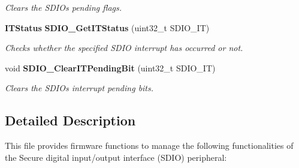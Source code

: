 \begin{DoxyCompactItemize}
\begin{DoxyCompactList}\small\item\em Clears the S\+D\+IO\textquotesingle{}s pending flags. \end{DoxyCompactList}\item 
\textbf{ I\+T\+Status} \textbf{ S\+D\+I\+O\+\_\+\+Get\+I\+T\+Status} (uint32\+\_\+t S\+D\+I\+O\+\_\+\+IT)
\begin{DoxyCompactList}\small\item\em Checks whether the specified S\+D\+IO interrupt has occurred or not. \end{DoxyCompactList}\item 
void \textbf{ S\+D\+I\+O\+\_\+\+Clear\+I\+T\+Pending\+Bit} (uint32\+\_\+t S\+D\+I\+O\+\_\+\+IT)
\begin{DoxyCompactList}\small\item\em Clears the S\+D\+IO\textquotesingle{}s interrupt pending bits. \end{DoxyCompactList}\end{DoxyCompactItemize}


\subsection{Detailed Description}
This file provides firmware functions to manage the following functionalities of the Secure digital input/output interface (S\+D\+IO) peripheral\+: 

